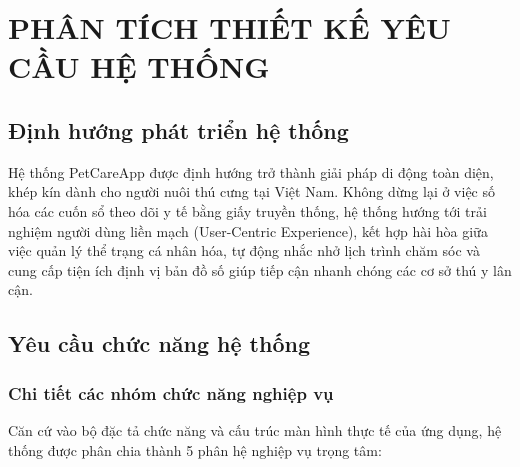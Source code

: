 \chapter{PHÂN TÍCH THIẾT KẾ YÊU CẦU HỆ THỐNG}
\label{chap:phan_tich_thiet_ke}

\section{Định hướng phát triển hệ thống}
\label{sec:dinh_huong}

Hệ thống PetCareApp được định hướng trở thành giải pháp di động toàn diện, khép kín dành cho người nuôi thú cưng tại Việt Nam. Không dừng lại ở việc số hóa các cuốn sổ theo dõi y tế bằng giấy truyền thống, hệ thống hướng tới trải nghiệm người dùng liền mạch (User-Centric Experience), kết hợp hài hòa giữa việc quản lý thể trạng cá nhân hóa, tự động nhắc nhở lịch trình chăm sóc và cung cấp tiện ích định vị bản đồ số giúp tiếp cận nhanh chóng các cơ sở thú y lân cận.

\section{Yêu cầu chức năng hệ thống}
\label{sec:yeu_cau_chuc_nang}

\subsection{Chi tiết các nhóm chức năng nghiệp vụ}
\label{subsec:nhom_chuc_nang}

Căn cứ vào bộ đặc tả chức năng và cấu trúc màn hình thực tế của ứng dụng, hệ thống được phân chia thành 5 phân hệ nghiệp vụ trọng tâm:

